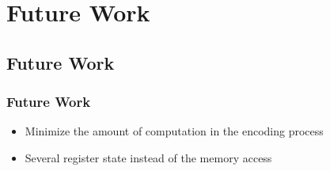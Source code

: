 \section{Future Work}

\subsection{Future Work}
\begin{frame}
	\frametitle{Future Work}
	\begin{itemize}
		\setlength\itemsep{1em}
		\item
			Minimize the amount of computation in the encoding process
		\item
			Several register state instead of the memory access
	\end{itemize}
\end{frame}